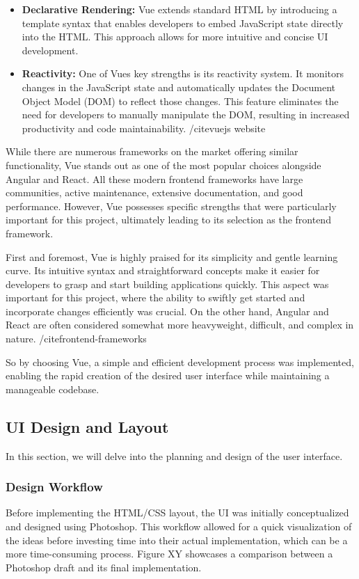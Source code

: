 \documentclass[a4paper,10pt]{report} %
\begin{document}
\begin{itemize}
  \item \textbf{Declarative Rendering:} Vue extends standard HTML by introducing a template syntax that enables developers to embed JavaScript state directly into the HTML. This approach allows for more intuitive and concise UI development.

  \item \textbf{Reactivity:} One of Vues key strengths is its reactivity system. It monitors changes in the JavaScript state and automatically updates the Document Object Model (DOM) to reflect those changes. This feature eliminates the need for developers to manually manipulate the DOM, resulting in increased productivity and code maintainability. /cite{vuejs website}
\end{itemize}

While there are numerous frameworks on the market offering similar functionality, Vue stands out as one of the most popular choices alongside Angular and React. All these modern frontend frameworks have large communities, active maintenance, extensive documentation, and good performance. However, Vue possesses specific strengths that were particularly important for this project, ultimately leading to its selection as the frontend framework.

First and foremost, Vue is highly praised for its simplicity and gentle learning curve. Its intuitive syntax and straightforward concepts make it easier for developers to grasp and start building applications quickly. This aspect was important for this project, where the ability to swiftly get started and incorporate changes efficiently was crucial. On the other hand, Angular and React are often considered somewhat more heavyweight, difficult, and complex in nature. /cite{frontend-frameworks}

So by choosing Vue, a simple and efficient development process was implemented, enabling the rapid creation of the desired user interface while maintaining a manageable codebase.

\subsection{UI Design and Layout}
In this section, we will delve into the planning and design of the user interface.

\subsubsection{Design Workflow}
Before implementing the HTML/CSS layout, the UI was initially conceptualized and designed using Photoshop. This workflow allowed for a quick visualization of the ideas before investing time into their actual implementation, which can be a more time-consuming process. Figure XY showcases a comparison between a Photoshop draft and its final implementation.
\end{document}
